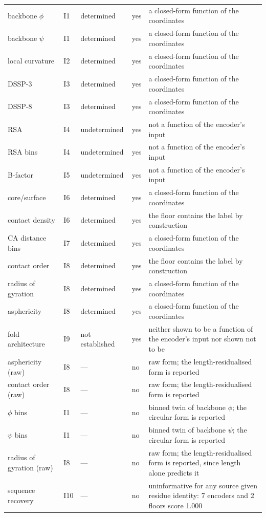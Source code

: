 \begin{longtable}{P{3.0cm}P{0.7cm}P{2.0cm}P{1.9cm}P{5.0cm}}
backbone $\phi$ & I1 & determined & yes & a closed-form function of the coordinates \\
backbone $\psi$ & I1 & determined & yes & a closed-form function of the coordinates \\
local curvature & I2 & determined & yes & a closed-form function of the coordinates \\
DSSP-3 & I3 & determined & yes & a closed-form function of the coordinates \\
DSSP-8 & I3 & determined & yes & a closed-form function of the coordinates \\
RSA & I4 & undetermined & yes & not a function of the encoder's input \\
RSA bins & I4 & undetermined & yes & not a function of the encoder's input \\
B-factor & I5 & undetermined & yes & not a function of the encoder's input \\
core/surface & I6 & determined & yes & a closed-form function of the coordinates \\
contact density & I6 & determined & yes & the floor contains the label by construction \\
CA distance bins & I7 & determined & yes & a closed-form function of the coordinates \\
contact order & I8 & determined & yes & the floor contains the label by construction \\
radius of gyration & I8 & determined & yes & a closed-form function of the coordinates \\
asphericity & I8 & determined & yes & a closed-form function of the coordinates \\
fold architecture & I9 & not established & yes & neither shown to be a function of the encoder's input nor shown not to be \\
asphericity (raw) & I8 & --- & no & raw form; the length-residualised form is reported \\
contact order (raw) & I8 & --- & no & raw form; the length-residualised form is reported \\
$\phi$ bins & I1 & --- & no & binned twin of backbone $\phi$; the circular form is reported \\
$\psi$ bins & I1 & --- & no & binned twin of backbone $\psi$; the circular form is reported \\
radius of gyration (raw) & I8 & --- & no & raw form; the length-residualised form is reported, since length alone predicts it \\
sequence recovery & I10 & --- & no & uninformative for any source given residue identity: 7 encoders and 2 floors score 1.000 \\

\end{longtable}
\endgroup
